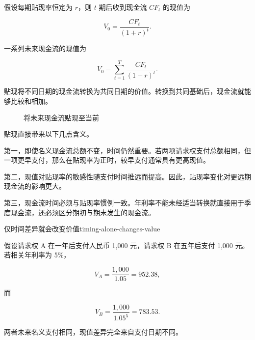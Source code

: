 假设每期贴现率恒定为 $r$，则 $t$ 期后收到现金流 $CF_t$ 的现值为



\[
V_0=\frac{CF_t}{(1+r)^t}.
\]

一系列未来现金流的现值为


\begin{equation}
V_0=\sum_{t=1}^{T}
\frac{CF_t}{(1+r)^t}.
\label{eq:ch5-pv-cash-flow-stream}
\end{equation}

贴现将不同日期的现金流转换为共同日期的价值。转换到共同基础后，现金流就能够比较和相加。

\begin{figure}[H]
\centering
{}

\caption{将未来现金流贴现至当前}
\label{fig:ch5-discount-timeline}
\end{figure}

贴现直接带来以下几点含义。

第一，即使名义现金流总额不变，时间仍然重要。若两项请求权支付总额相同，但一项更早支付，那么在贴现率为正时，较早支付通常具有更高现值。

第二，现值对贴现率的敏感性随支付时间推远而提高。因此，贴现率变化对更远期现金流的影响更大。

第三，现金流时间必须与贴现率惯例一致。年利率不能未经适当转换就直接用于季度现金流，还必须区分期初与期末发生的现金流。

\begin{example}{仅时间差异就会改变价值}{timing-alone-changes-value}

假设请求权 A 在一年后支付人民币 1,000 元，请求权 B 在五年后支付 1,000 元。若相关年利率为 5\%，

\[
V_A=\frac{1,000}{1.05}=952.38,
\]

而

\[
V_B=\frac{1,000}{1.05^5}=783.53.
\]

两者未来名义支付相同，现值差异完全来自支付日期不同。

\end{example}

